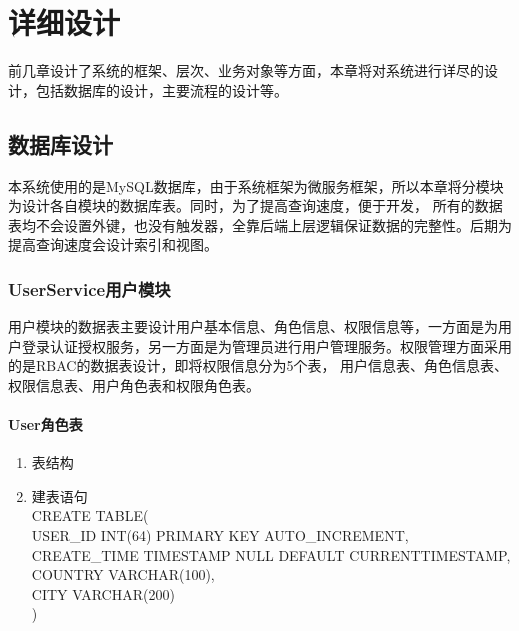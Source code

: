 \chapter{详细设计}
前几章设计了系统的框架、层次、业务对象等方面，本章将对系统进行详尽的设计，包括数据库的设计，主要流程的设计等。
\section{数据库设计}
本系统使用的是MySQL数据库，由于系统框架为微服务框架，所以本章将分模块为设计各自模块的数据库表。同时，为了提高查询速度，便于开发，
所有的数据表均不会设置外键，也没有触发器，全靠后端上层逻辑保证数据的完整性。后期为提高查询速度会设计索引和视图。
\subsection{UserService用户模块}
用户模块的数据表主要设计用户基本信息、角色信息、权限信息等，一方面是为用户登录认证授权服务，另一方面是为管理员进行用户管理服务。权限管理方面采用的是RBAC的数据表设计，即将权限信息分为5个表，
用户信息表、角色信息表、权限信息表、用户角色表和权限角色表。
\subsubsection{User角色表}
\begin{enumerate}
    \item 表结构
    \begin{table}[htbp]
        \centering
        \end{table}
    \item 建表语句\\
        CREATE TABLE(\\
            USER\_ID INT(64) PRIMARY KEY AUTO\_INCREMENT,\\
            CREATE\_TIME TIMESTAMP NULL DEFAULT CURRENTTIMESTAMP,\\
            COUNTRY VARCHAR(100),\\
            CITY VARCHAR(200)\\
        )
    \end{enumerate}

